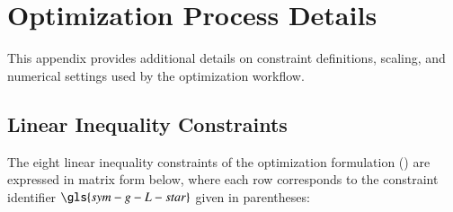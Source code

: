 \section{Optimization Process Details}
This appendix provides additional details on constraint definitions, scaling, and numerical settings used by the optimization workflow.

\subsection{Linear Inequality Constraints}
\label{remdo:sec:appendix-linear-constraints}

The eight linear inequality constraints of the optimization formulation () are expressed in matrix form below, where each row corresponds to the constraint identifier $\gls{sym-g-L-star}$ given in parentheses:
